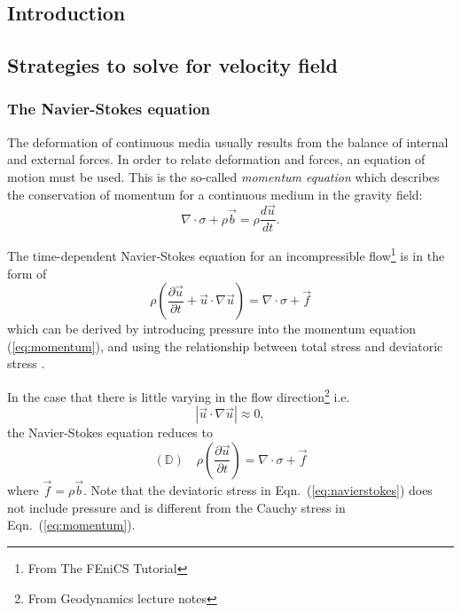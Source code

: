 \documentclass[12pt]{article}
\numberwithin{figure}{section}  %
\numberwithin{equation}{section}  %
\begin{document}
\begin{multicols}{2}

\section{Introduction}

\subsection{Strategies to solve for velocity field}

\subsubsection{The Navier-Stokes equation}

The deformation of continuous media usually results from the balance of internal and external forces. In order to relate deformation and forces, an equation of motion must be used. This is the so-called \emph{momentum equation} which describes the conservation of momentum for a continuous medium in the gravity field:
\begin{equation}\label{eq:momentum}
    \nabla\cdot\sigma + \rho\vec{b} = \rho\dfrac{d\vec{u}}{dt}.
\end{equation}

The time-dependent Navier-Stokes equation for an incompressible flow\footnote{From The FEniCS Tutorial} is in the form of
\begin{equation}
    \rho\left(\dfrac{\partial\vec{u}}{\partial{t}} + \vec{u}\cdot\nabla\vec{u}\right) = \nabla\cdot\sigma + \vec{f}
\end{equation}
which can be derived by introducing pressure into the momentum equation (\ref{eq:momentum}), and using the relationship between total stress and deviatoric stress \citep{gerya2009introduction}.

In the case that there is little varying in the flow direction\footnote{From Geodynamics lecture notes} i.e.
\begin{equation}
    |\vec{u}\cdot\nabla\vec{u}| \approx 0,
\end{equation}
the Navier-Stokes equation reduces to
\begin{equation}\label{eq:navierstokes}
    (\mathbb{D})\quad\rho\left(\dfrac{\partial\vec{u}}{\partial{t}}\right) = \nabla\cdot\sigma + \vec{f}
\end{equation}
where $\vec{f}=\rho\vec{b}$. Note that the deviatoric stress in Eqn.\ (\ref{eq:navierstokes}) does not include pressure and is different from the Cauchy stress in Eqn.\ (\ref{eq:momentum}).


\end{multicols}
\end{document}
